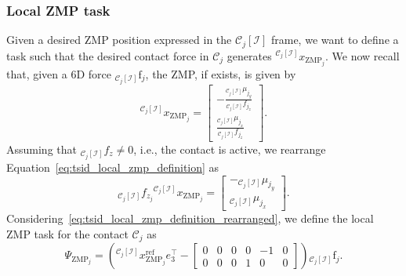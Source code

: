\subsubsection{Local ZMP task}
Given a desired ZMP position expressed in the ${\mathcal{C}_j[\mathcal{I}]}$ frame, we want to define a task such that the desired contact force in $\mathcal{C}_j$ generates ${}^{\mathcal{C}_j[\mathcal{I}]} x_{\text{ZMP}_j}$. We now recall that, given a 6D force ${}_{\mathcal{C}_j[\mathcal{I}]} \mathrm{f}_j$, the ZMP, if exists, is given by~\citep{vukobratovic2004zero}
\begin{equation}
    \label{eq:tsid_local_zmp_definition}
   {}^{\mathcal{C}_j[\mathcal{I}]} x_{\text{ZMP}_j} = 
   \begin{bmatrix}
   -\frac{{}_{\mathcal{C}_j[\mathcal{I}]} \mu_{j_y}}{{}_{\mathcal{C}_j[\mathcal{I}]} f_{j_z}} \\
   \frac{{}_{\mathcal{C}_j[\mathcal{I}]} \mu_{j_x}}{{}_{\mathcal{C}_j[\mathcal{I}]} f_{j_z}}
   \end{bmatrix}.
\end{equation}
Assuming that ${}_{\mathcal{C}_j[\mathcal{I}]} f_z \ne 0$, i.e., the contact is active, we rearrange Equation~\eqref{eq:tsid_local_zmp_definition} as
\begin{equation}
    \label{eq:tsid_local_zmp_definition_rearranged}
  {}_{\mathcal{C}_j[\mathcal{I}]} f_{z_j}  {}^{\mathcal{C}_j[\mathcal{I}]} x_{\text{ZMP}_j} = 
   \begin{bmatrix}
   -{}_{\mathcal{C}_j[\mathcal{I}]} \mu_{j_y} \\
   {}_{\mathcal{C}_j[\mathcal{I}]} \mu_{j_x}
   \end{bmatrix}.
\end{equation}
Considering~\eqref{eq:tsid_local_zmp_definition_rearranged}, we define the local ZMP task for the contact $\mathcal{C}_j$ as
\begin{equation}
    \Psi_{\text{ZMP}_j} = \left({}^{\mathcal{C}_j[\mathcal{I}]} x_{\text{ZMP}_j}^\text{ref} e_3^\top - 
    \begin{bmatrix}
        0& 0&0&0&-1&0 \\
        0& 0&0&1&0&0
    \end{bmatrix} \right) {}_{\mathcal{C}_j[\mathcal{I}]} \mathrm{f}_j.
\end{equation}


